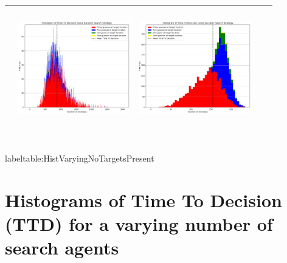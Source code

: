 \begin{landscape}
\begin{table}[h!]
\begin{tabular}{ | c | c | c | c | c |}
\begin{minipage}[c][58mm][c]{49mm}
    \end{minipage}
    &
    \begin{minipage}[c][58mm][c]{49mm}
      \includegraphics[width=49mm, height=52mm]{Chapters/MultiAgentTargetDetection/Figs/Histograms/MultipleTarget/3/3RandomHistogram.png}
    \end{minipage}
    &
    \begin{minipage}[c][58mm][c]{49mm}
      \includegraphics[width=49mm, height=52mm]{Chapters/MultiAgentTargetDetection/Figs/Histograms/MultipleTarget/3/3SaccadicHistogram.png}
    \end{minipage}
    \\
    \hline
   
  \end{tabular}
  \\label{table:HistVaryingNoTargetsPresent}
\end{table}
\break




\vspace*{\fill}
\section{Histograms of Time To Decision (TTD) for a varying number of search agents}


\end{landscape}
